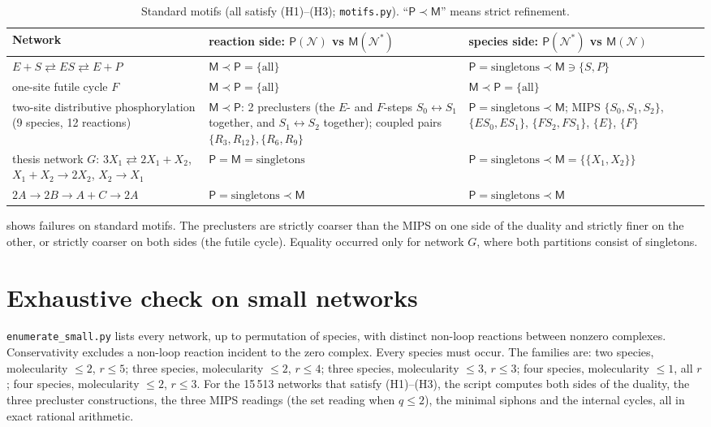 \documentclass[11pt,a4paper]{report}
\newcommand{\Net}{\mathcal{N}}
\newcommand{\Pre}{\mathsf{P}}
\newcommand{\Mips}{\mathsf{M}}
\begin{document}
\begin{table}[ht]
\centering
\caption{Standard motifs (all satisfy (H1)--(H3); \texttt{motifs.py}). ``\(\Pre\prec\Mips\)'' means strict
refinement.}\label{tab:motifs}
\small
\begin{tabular}{>{\raggedright\arraybackslash}p{3.4cm}>{\raggedright\arraybackslash}p{4.9cm}>{\raggedright\arraybackslash}p{4.9cm}}
\hline
Network & reaction side: \(\Pre(\Net)\) vs \(\Mips(\Net^*)\) & species side: \(\Pre(\Net^*)\) vs \(\Mips(\Net)\) \\
\hline
\(E+S\rightleftarrows ES\rightleftarrows E+P\) & \(\Mips\prec\Pre=\{\text{all}\}\) & \(\Pre=\text{singletons}\prec\Mips\ni\{S,P\}\) \\
one-site futile cycle \(F\) & \(\Mips\prec\Pre=\{\text{all}\}\) & \(\Mips\prec\Pre=\{\text{all}\}\) \\
two-site distributive phosphorylation (9 species, 12 reactions) & \(\Mips\prec\Pre\): 2 preclusters (the \(E\)- and \(F\)-steps \(S_0\leftrightarrow S_1\) together, and \(S_1\leftrightarrow S_2\) together); coupled pairs \(\{R_3,R_{12}\},\{R_6,R_9\}\) & \(\Pre=\text{singletons}\prec\Mips\); MIPS \(\{S_0,S_1,S_2\}\), \(\{ES_0,ES_1\}\), \(\{FS_2,FS_1\}\), \(\{E\}\), \(\{F\}\) \\
thesis network \(G\): \(3X_1\rightleftarrows 2X_1+X_2\), \(X_1+X_2\to2X_2\), \(X_2\to X_1\) & \(\Pre=\Mips=\text{singletons}\) & \(\Pre=\text{singletons}\prec\Mips=\{\{X_1,X_2\}\}\) \\
\(2A\to2B\to A+C\to2A\) & \(\Pre=\text{singletons}\prec\Mips\) & \(\Pre=\text{singletons}\prec\Mips\) \\
\hline
\end{tabular}
\end{table}

 shows failures on standard motifs. The preclusters are strictly coarser
than the MIPS on one side of the duality and strictly finer on the other, or strictly coarser on both sides (the futile
cycle). Equality occurred only for network \(G\), where both partitions consist of singletons.

\section{Exhaustive check on small networks}

\texttt{enumerate\_small.py} lists every network, up to permutation of species, with distinct non-loop reactions between
nonzero complexes. Conservativity excludes a non-loop reaction incident to the zero complex. Every species must occur. The families are: two
species, molecularity \(\le2\), \(r\le5\); three species, molecularity \(\le2\), \(r\le4\); three species, molecularity
\(\le3\), \(r\le3\); four species, molecularity \(\le1\), all \(r\); four species, molecularity \(\le2\), \(r\le3\).
For the 15\,513 networks that satisfy (H1)--(H3), the script computes both sides of the duality, the three precluster
constructions, the three MIPS readings (the set reading when \(q\le2\)), the minimal siphons and the internal cycles,
all in exact rational arithmetic.
\end{document}
